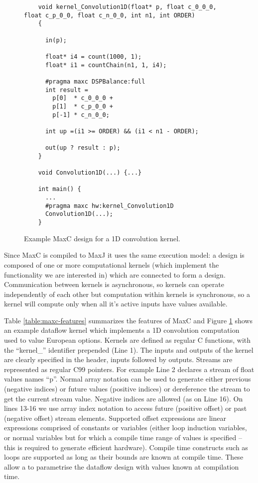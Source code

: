 \begin{figure}[!h]
  \begin{lstlisting}
    void kernel_Convolution1D(float* p, float c_0_0_0, float c_p_0_0, float c_n_0_0, int n1, int ORDER)
    {

      in(p);

      float* i4 = count(1000, 1);
      float* i1 = countChain(n1, 1, i4);

      #pragma maxc DSPBalance:full
      int result =
        p[0]  * c_0_0_0 +
        p[1]  * c_p_0_0 +
        p[-1] * c_n_0_0;

      int up =(i1 >= ORDER) && (i1 < n1 - ORDER);

      out(up ? result : p);
    }

    void Convolution1D(...) {...}

    int main() {
      ...
      #pragma maxc hw:kernel_Convolution1D
      Convolution1D(...);
    }
  \end{lstlisting}
  \caption{Example MaxC design for a 1D convolution kernel.}
  \label{fig:maxc-1dconv}
\end{figure}

Since MaxC is compiled to MaxJ it uses the same execution model: a
design is composed of one or more computational kernels (which
implement the functionality we are interested in) which are connected
to form a design. Communication between kernels is asynchronous, so
kernels can operate independently of each other but computation within
kernels is synchronous, so a kernel will compute only when all it's
active inputs have values available.

Table \ref{table:maxc-features} summarizes the features of MaxC and
Figure \ref{fig:maxc-1dconv} shows an example dataflow kernel which
implements a 1D convolution computation used to value European
options.  Kernels are defined as regular C functions, with the
``kernel\_'' identifier prepended (Line 1). The inputs and outputs of
the kernel are clearly specified in the header, inputs followed by
outputs. Streams are represented as regular C99 pointers. For example
Line 2 declares a stream of float values names ``p''.  Normal array
notation can be used to generate either previous (negative indices) or
future values (positive indices) or dereference the stream to get the
current stream value. Negative indices are allowed (as on Line 16). On
lines 13-16 we use array index notation to access future (positive
offset) or past (negative offset) stream elements. Supported offset
expressions are linear expressions comprised of constants or variables
(either loop induction variables, or normal variables but for which a
compile time range of values is specified -- this is required to
generate efficient hardware).  Compile time constructs such as loops
are supported as long as their bounds are known at compile time. These
allow a to parametrise the dataflow design with values known at
compilation time.

